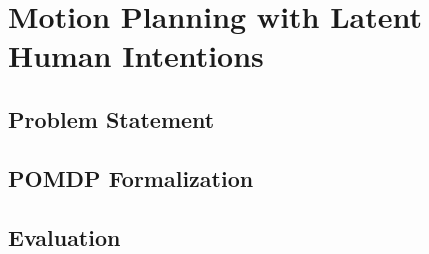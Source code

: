 \chapter{Motion Planning with Latent Human Intentions}\label{chap:motion-planning-hri}


\section{Problem Statement}\label{sec:hri-problem-statement}
\section{POMDP Formalization}\label{sec:hri-pomdp-formalization}
\section{Evaluation}\label{sec:hri-evaluation}
